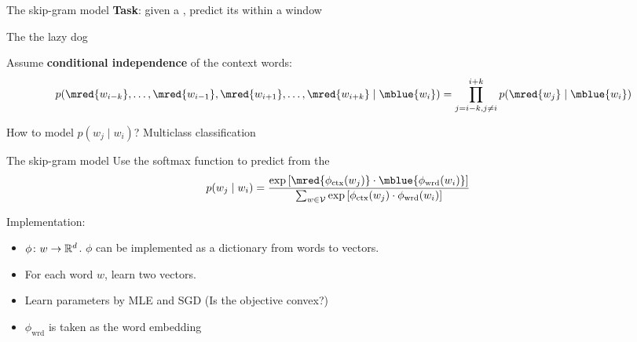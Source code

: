 \documentclass[usenames,dvipsnames,notes,11pt,aspectratio=169]{beamer}
\begin{document}
\begin{frame}
    {The skip-gram model}
    \textbf{Task}: given a , predict its  within a window
    \begin{center}
        The      the lazy dog
    \end{center}

    \pause
    Assume {\bf conditional independence} of the context words:
    $$
    p(\mred{w_{i-k}}, \ldots, \mred{w_{i-1}}, \mred{w_{i+1}}, \ldots, \mred{w_{i+k}} \mid \mblue{w_i}) =
    \prod_{j=i-k,j\neq i}^{i+k}p(\mred{w_j}\mid \mblue{w_i})
    $$

    \pause
    How to model $p(w_j\mid w_i)$? \pause \hspace{2em} Multiclass classification
\end{frame}

\begin{frame}
    {The skip-gram model}
    Use the softmax function to predict  from the 
    \begin{align*}
        p(w_j\mid w_i) %
        &= \frac{\exp\pb{\mred{\phi_{\text{ctx}}(w_j)}\cdot \mblue{\phi_{\text{wrd}}(w_i)}}}
        {\sum_{w\in\sV} \exp\pb{\phi_{\text{ctx}}(w_j)\cdot\phi_{\text{wrd}}(w_i)}}
    \end{align*}
    \pause

    \pause
    Implementation:\vspace{-1em}
    \begin{itemize}[<+->]
        \item $\phi\colon w \to \mathbb{R}^d$. 
        $\phi$ can be implemented as a dictionary from words to vectors.
    \item For each word $w$, learn two vectors.
        \item Learn parameters by MLE and SGD (Is the objective convex?)
        \item $\phi_{\text{wrd}}$ is taken as the word embedding
    \end{itemize}
\end{frame}
\end{document}
